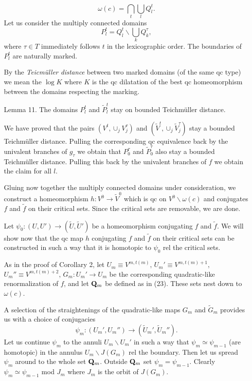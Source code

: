 $$ \omega(c)=\bigcap_t \bigcup_l  Q^t_l.$$
  Let us consider
the multiply connected domains 
$$P^t_l=Q^t_l\backslash\bigcup_k Q^{\tau}_k,$$
where $\tau\in T$ immediately follows $t$ in the lexicographic order.
The boundaries of $P^t_l$ are naturally marked.

By the {\sl Teicm\"{u}ller distance} between two marked domains
(of the same qc type) we mean the $\log K$ where $K$ is the qc
dilatation of the best qc homeomorphism between the domains respecting
the marking. 

\proclaim Lemma 11. The domains $P^t_l$ and $\tilde P^t_l$ stay on bounded
  Teichm\"{u}ller distance.

 We have proved that the pairs $(V^t, \cup_j V^{\tau}_j)$
and $(\tilde V^t, \cup_j \tilde V^{\tau}_j)$
stay a bounded Teichm\"{u}ller distance.  Pulling the corresponding qc
equivalence back by the univalent branches of $g_{\tau}$ we obtain that
$P^{\tau}_0$ and $\tilde P^{\tau}_0$ also stay a bounded Teichm\"{u}ller
distance. Pulling this back by the univalent branches of $f$ we obtain the
claim for all $l$.  \QED 

Gluing now together the multiply connected domains under consideration,
we construct a homeomorphism $h: V^0\rightarrow \tilde V^0$ which is qc on 
$V^0\backslash\omega(c)$ and conjugates $f$ and $\tilde f$ on their critical sets.
Since the critical sets are removable, we are done. 

\medskip{} Let 
$\psi_0: (U,U')\rightarrow (\tilde U,\tilde U')$ be a homeomorphism
conjugating $f$ and $\tilde f$. We will show now that the qc map $h$
conjugating $f$ and $\tilde f$ on their critical sets can be constructed
in such a way that it is homotopic to $\psi_0$ rel the critical sets.

As in the proof of Corollary 2,
let $U_m\equiv V^{m,t(m)}$, $U_m'\equiv V^{m,t(m)+1}$, 
$U_m''\equiv V^{m,t(m)+2}$,
$G_m : U_m'\rightarrow U_m$ be the corresponding quadratic-like
renormalization of $f$, and let ${\bf Q}_m$ be defined as in (23).
These sets nest down to $\omega(c)$.

 A selection of the straightenings of
the quadratic-like  maps $G_m$ and $\tilde G_m$ provides us with
a choice of conjugacies 
$$\psi_m: (U_m',U_m'')\rightarrow (\tilde U_m', \tilde U_m'').$$
Let us continue $\psi_m$ to the annuli $U_m\backslash U_m'$ in such a way
that $\psi_m\simeq \psi_{m-1}$ (are homotopic) in the annulus 
$U_m\backslash J(G_m)$ rel the boundary.
Then let us spread $\psi_m$ around to the whole set ${\bf Q}_m$.
Outside ${\bf Q}_m$ set $\psi_m=\psi_{m-1}$. Clearly $\psi_m\simeq \psi_{m-1}$
mod $J_m$ where $J_m$ is the orbit of $J(G_m)$.

